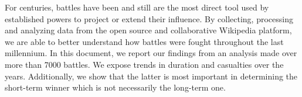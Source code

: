 For centuries, battles have been and still are the most direct tool used by established powers to project or extend their influence. By collecting, processing and analyzing data from the open source and collaborative Wikipedia platform, we are able to better understand how battles were fought throughout the last millennium. In this document, we report our findings from an analysis made over more than 7000 battles. We expose trends in duration and casualties over the years. Additionally, we show that the latter is most important in determining the short-term winner which is not necessarily the long-term one.